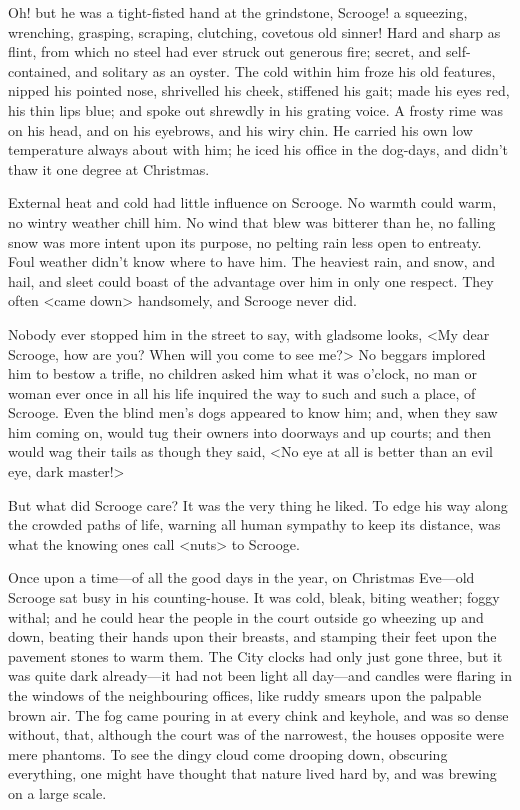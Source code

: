 Oh! but he was a tight-fisted hand at the grindstone, Scrooge! a squeezing, wrenching, grasping, scraping, clutching, covetous old sinner! Hard and sharp as flint, from which no steel had ever struck out generous fire; secret, and self-contained, and solitary as an oyster. The cold within him froze his old features, nipped his pointed nose, shrivelled his cheek, stiffened his gait; made his eyes red, his thin lips blue; and spoke out shrewdly in his grating voice. A frosty rime was on his head, and on his eyebrows, and his wiry chin. He carried his own low temperature always about with him; he iced his office in the dog-days, and didn't thaw it one degree at Christmas.

External heat and cold had little influence on Scrooge. No  warmth could warm, no wintry weather chill him. No wind that blew was bitterer than he, no falling snow was more intent upon its purpose, no pelting rain less open to entreaty. Foul weather didn't know where to have him. The heaviest rain, and snow, and hail, and sleet could boast of the advantage over him in only one respect. They often <came down> handsomely, and Scrooge never did.

Nobody ever stopped him in the street to say, with gladsome looks, <My dear Scrooge, how are you? When will you come to see me?> No beggars implored him to bestow a trifle, no children asked him what it was o'clock, no man or woman ever once in all his life inquired the way to such and such a place, of Scrooge. Even the blind men's dogs appeared to know him; and, when they saw him coming on, would tug their owners into doorways and up courts; and then would wag their tails as though they said, <No eye at all is better than an evil eye, dark master!>

But what did Scrooge care? It was the very thing he liked. To edge his way along the crowded paths of life, warning all human sympathy to keep its distance, was what the knowing ones call <nuts> to Scrooge.

Once upon a time—of all the good days in the year, on Christmas Eve—old Scrooge sat busy in his counting-house. It was cold, bleak, biting weather; foggy withal; and he could hear the people in the court outside go wheezing up and down, beating their hands upon their breasts, and stamping their feet upon the pavement stones to warm them. The City clocks had only just gone three, but it was quite dark already—it had not been light all day—and candles were flaring in the windows of the neighbouring offices, like ruddy smears upon the palpable brown air. The fog came pouring in at every chink and keyhole, and was so dense without, that, although the court was of the narrowest, the houses opposite were mere phantoms. To see the dingy cloud come drooping down, obscuring everything, one might have thought that nature lived hard by, and was brewing on a large scale.


